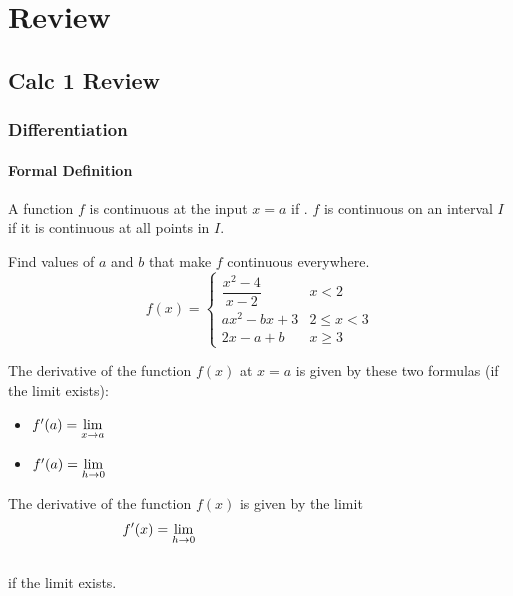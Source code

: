 \documentclass[notes]{subfiles}
\begin{document}
	\chapter*{Review}
	\setcounter{section}{0}
	\setcounter{page}{1}
	\fancyhead[LO,RE]{\bfseries \small \currentname}
	\fancyfoot[C]{{}}
	\fancyfoot[RO,LE]{\large \thepage}	%
	
\section*{Calc 1 Review}\label{csr}
	\subsection*{Differentiation}
	\subsubsection*{Formal Definition}
		\begin{defn}[Continuity]
			A function $f$ is continuous at the input $x =a$ if .  $f$ is continuous on an interval $I$ if it is continuous at all points in $I$.
		\end{defn}
		\begin{ex}
			Find values of $a$ and $b$ that make $f$ continuous everywhere.
				\[f(x) = \begin{cases}\dfrac{x^2-4}{x-2} & x < 2 \\ ax^2 - bx +  3& 2\leq x < 3 \\ 2x - a + b & x \geq 3 \end{cases}\]
		\end{ex}
			
		\begin{defn}[Derivative of $f$ at $x =a$]
			The derivative of the function $f(x)$ at $x =a$ is given by these two formulas (if the limit exists):\\[15pt]
			\begin{itemize}
				\setlength \itemsep{25pt}
				
				\item $f'(a) = \displaystyle \lim_{x\to a}$
				\item $f'(a) = \displaystyle \lim_{h\to 0}$
			\end{itemize}
		\end{defn}
			\newpage
			
		\begin{defn}
			The derivative of the function $f(x)$ is given by the limit\\[15pt]
				\[f'(x) = \displaystyle \lim_{h\to 0} \hspace{2in}\]
				\\
			if the limit exists.
		\end{defn}
		
\end{document}
